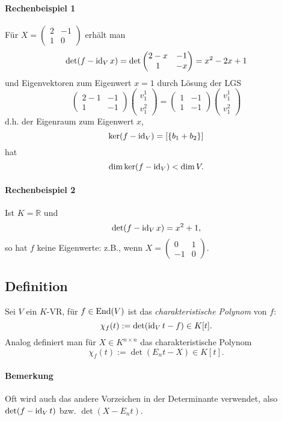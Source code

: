 \paragraph{Rechenbeispiel 1}
	Für $ X = \begin{pmatrix}2&-1\\1&0\end{pmatrix} $ erhält man
		\[ \det(f-\operatorname{id}_Vx) = \det\begin{pmatrix}2-x&-1\\1&-x	\end{pmatrix} =x^2-2x+1 \]
	und Eigenvektoren zum Eigenwert $ x = 1 $ durch Lösung der LGS
		\[ \begin{pmatrix}
		2-1&-1\\1&-1
		\end{pmatrix}\begin{pmatrix}
		v_1^1\\v_1^2
		\end{pmatrix} =  \begin{pmatrix}
		1&-1\\1&-1
		\end{pmatrix}\begin{pmatrix}
		v_1^1\\v_1^2
		\end{pmatrix} \]
	d.h. der Eigenraum zum Eigenwert $ x $,
		\[ \ker(f-\operatorname{id}_V) = [\{b_1+b_2\}] \]
	hat
		\[ \dim \ker(f-\operatorname{id}_V)<\dim V. \]
\paragraph{Rechenbeispiel 2}
	Ist $ K=\mathbb{R} $ und
		\[ \det(f-\operatorname{id}_Vx)=x^2+1, \]
	so hat $ f $ keine Eigenwerte: z.B., wenn
		$ X=\begin{pmatrix} 0&1\\-1&0 \end{pmatrix} $.
		
\subsection{Definition} 
	Sei $ V $ ein $ K $-VR, für $ f\in\operatorname{End}(V) $ ist das \emph{charakteristische Polynom} von $ f $:
		\[ \chi_f(t) := \det (\operatorname{id}_Vt-f)\in K[t]. \]
	Analog definiert man für $ X\in K^{n\times n} $ das charakteristische Polynom
		\[ \chi_f(t) := \det (E_nt-X)\in K[t]. \]
\paragraph{Bemerkung}
	Oft wird auch das andere Vorzeichen in der Determinante verwendet, also $ \det(f-\operatorname{id}_Vt) $ bzw. $ \det(X-E_nt) $.
